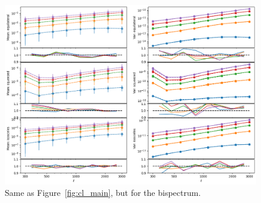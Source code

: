 \begin{figure}[p]
    \centering
    \includegraphics[width=\textwidth]{figures/results/bl_main.png}
    \caption{Same as Figure~\ref{fig:cl_main}, but for the bispectrum. }
    \label{fig:bl_main}
\end{figure}

